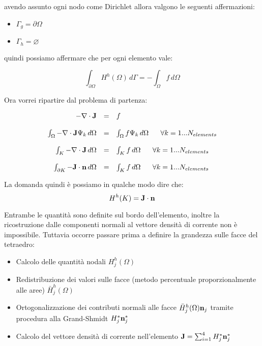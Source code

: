 avendo assunto ogni nodo come Dirichlet allora valgono le seguenti affermazioni:
\begin{itemize}
\item $\Gamma_g = \partial \Omega$
\item $\Gamma_h = \varnothing$
\end{itemize}

quindi possiamo affermare che per ogni elemento vale:

\begin{equation}
\int_{\partial\Omega}H^h(\Omega) \, d\Gamma =  - \int_\Omega f \, d\Omega
\end{equation}

Ora vorrei ripartire dal problema di partenza:

\begin{equation}
\begin{array}{rcl}
-\nabla \cdot \vect{J} & = & f \\
\\
\int_\Omega -\nabla \cdot \vect{J} \Psi_k \, d\Omega & = & 
\int_\Omega f \Psi_k \, d\Omega  \psp{10}  \forall k = 1 ... N_{elements}\\
\\
\int_K -\nabla \cdot \vect{J} \, d\Omega & = & \int_K f \, d\Omega  \psp{10}  \forall k = 1 ... N_{elements}\\
\\
\int_{\partial K} -\vect{J} \cdot \vect{n} \, d\Omega & = & \int_K f \, d\Omega  \psp{10}  \forall k = 1 ... N_{elements}\\

\end{array}
\end{equation}

La domanda quindi \`e possiamo in qualche modo dire che:
\begin{equation}
H^h(K) = \mathbf{J}\cdot \mathbf{n} 
\end{equation}

Entrambe le quantit\`a sono definite sul bordo dell'elemento, inoltre la ricostruzione dalle componenti normali al vettore densit\`a di corrente non \`e impossibile.
Tuttavia occorre passare prima a definire la grandezza sulle facce del tetraedro:
\begin{itemize}
\item Calcolo delle quantit\`a nodali $H^h_j(\Omega)$
\item Redistribuzione dei valori sulle facce (metodo percentuale proporzionalmente alle aree) $\bar{H}^h_j(\Omega)$
\item Ortogonalizzazione dei contributi normali alle facce $\bar{H}^h_j(\Omega) \mathbf{n}_j$ tramite procedura alla Grand-Shmidt $H^*_j \mathbf{n}_j^*$
\item Calcolo del vettore densit\`a di corrente nell'elemento $\mathbf{J}=\sum_{i=1}^4 H^*_j\mathbf{n}_j^*$
\end{itemize}


